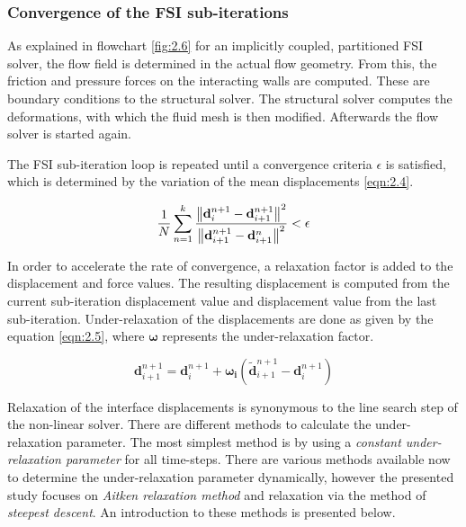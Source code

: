 \subsubsection*{Convergence of the FSI sub-iterations}
As explained in flowchart \ref{fig:2.6} for an implicitly coupled, partitioned FSI solver, the flow field is determined in the actual flow geometry. From this, the friction and pressure forces on the interacting walls are computed. These are boundary conditions to the structural solver. The structural solver computes the deformations, with which the fluid mesh is then modified. Afterwards the flow solver is started again. 

The FSI sub-iteration loop is repeated until a convergence criteria $\epsilon$ is satisfied, which is determined by the variation of the mean displacements \ref{eqn:2.4}.

\begin{equation}\label{eqn:2.4}
\frac{1}{N}\sum_{n=1}^{k}\frac{\norm{\mathbf{d}_{i}^{n+1}-\mathbf{d}_{i+1}^{n+1}}^2}{\norm{\mathbf{d}_{i+1}^{n+1}-\mathbf{d}_{i+1}^{n}}^2}<\epsilon
\end{equation}

In order to accelerate the rate of convergence, a relaxation factor is added to the displacement and force values. The resulting displacement is computed from the current sub-iteration displacement value and displacement value from the last sub-iteration. Under-relaxation of the displacements are done as given by the equation \ref{eqn:2.5}, where $\mathbf{\omega}$ represents the under-relaxation factor.

\begin{equation}\label{eqn:2.5}
\mathbf{d}_{i+1}^{n+1}=\mathbf{d}_{i}^{n+1}+\mathbf{\omega_{i}}\left(\tilde{\mathbf{d}}_{i+1}^{n+1}-\mathbf{d}_{i}^{n+1}\right)
\end{equation} 

Relaxation of the interface displacements is synonymous to the line search step of the non-linear solver. There are different methods to calculate the under-relaxation parameter. The most simplest method is by using a \textit{constant under-relaxation parameter} for all time-steps. There are various methods available now to determine the under-relaxation parameter dynamically, however the presented study focuses on \textit{Aitken relaxation method} and relaxation via the method of \textit{steepest descent}. An introduction to these methods is presented below.


